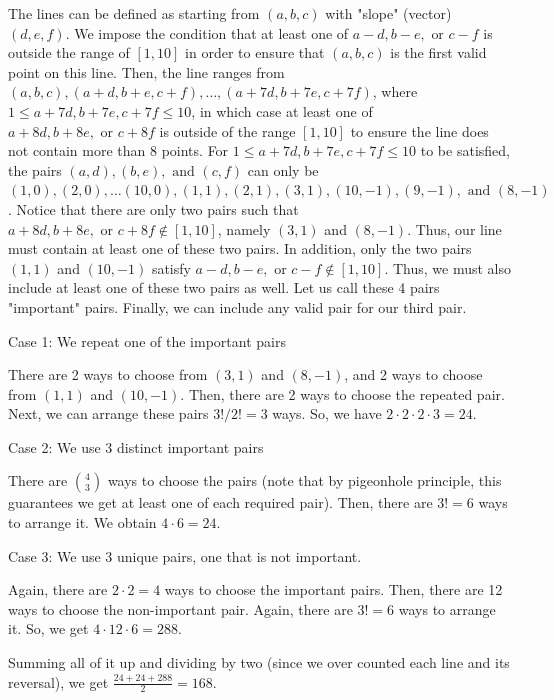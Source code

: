 \begin{enumerate}
The lines can be defined as starting from $(a, b, c)$ with "slope" (vector) $(d, e, f)$. We impose the condition that at least one of $a - d, b - e, \textrm{ or } c - f$ is outside the range of $[1, 10]$ in order to ensure that $(a, b, c)$ is the first valid point on this line. Then, the line ranges from $(a, b, c), (a + d, b + e, c + f), \ldots, (a + 7d, b + 7e, c + 7f)$, where $1 \le a + 7d, b + 7e, c + 7f \le 10$, in which case at least one of $a + 8d, b + 8e, \textrm{ or } c + 8f$ is outside of the range $[1, 10]$ to ensure the line does not contain more than 8 points. For $1 \le a + 7d, b + 7e, c + 7f \le 10$ to be satisfied, the pairs $(a, d), (b, e), \textrm{ and } (c, f)$ can only be $(1, 0), (2, 0), \ldots (10, 0), (1, 1), (2, 1), (3, 1), (10, -1), (9, -1), \textrm{ and } (8, -1)$. Notice that there are only two pairs such that $a + 8d, b + 8e, \textrm{ or } c + 8f \not \in [1,  10]$, namely $(3, 1)$ and $(8, -1)$. Thus, our line must contain at least one of these two pairs. In addition, only the two pairs $(1, 1)$ and $(10, -1)$ satisfy $a - d, b - e, \textrm{ or } c - f \not \in [1, 10]$. Thus, we must also include at least one of these two pairs as well. Let us call these 4 pairs "important" pairs. Finally, we can include any valid pair for our third pair.

 Case 1: We repeat one of the important pairs

 There are 2 ways to choose from $(3, 1)$ and $(8, -1)$, and 2 ways to choose from $(1, 1)$ and $(10, -1)$. Then, there are 2 ways to choose the repeated pair. Next, we can arrange these pairs $3!/2! = 3$ ways. So, we have $2 \cdot 2 \cdot 2 \cdot 3 = 24.$

 Case 2: We use 3 distinct important pairs

 There are ${4 \choose 3}$ ways to choose the pairs (note that by pigeonhole principle, this guarantees we get at least one of each required pair). Then, there are $3! = 6$ ways to arrange it. We obtain $4 \cdot 6 = 24$.

 Case 3: We use 3 unique pairs, one that is not important.

 Again, there are $2 \cdot 2 = 4$ ways to choose the important pairs. Then, there are 12 ways to choose the non-important pair. Again, there are $3! = 6$ ways to arrange it. So, we get $4 \cdot 12 \cdot 6 = 288$.

 Summing all of it up and dividing by two (since we over counted each line and its reversal), we get $\frac{24 + 24 + 288}{2} = \boxed{168}.$




\end{enumerate}
